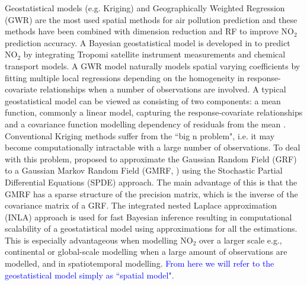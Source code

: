 \documentclass{article}
\begin{document}
Geostatistical models (e.g. Kriging) and Geographically Weighted Regression (GWR) are the most used spatial methods for air pollution prediction \citep{vicedo2013bayesian,li2014estimating,wang2021impacts,zou2016high} and these methods have been combined with dimension reduction \cite{zhai2018improved} and RF \citep{zhan2018satellite,liu2020integrate} to improve NO$_2$ prediction accuracy. A Bayesian geostatistical model is developed in \cite{BELOCONI2020105578} to predict NO$_2$ by integrating Tropomi satellite instrument measurements and chemical transport models. A GWR model naturally models spatial varying coefficients by fitting multiple local regressions depending on the homogeneity in response-covariate relationships when a number of observations are involved. A typical geostatistical model can be viewed as consisting of two components: a mean function, commonly a linear model, capturing the response-covariate relationships and a covariance function modelling dependency of residuals from the mean \citep{stackinla}. Conventional Kriging methods suffer from the ``big n problem", i.e. it may become computationally intractable with a large number of observations. To deal with this problem, \cite{lindgren2011explicit} proposed to approximate the Gaussian Random Field (GRF) to a Gaussian Markov Random Field (GMRF, \cite{rue2005gaussian}) using the Stochastic Partial Differential Equations (SPDE)
approach. The main advantage of this is that the GMRF has a sparse structure of the precision matrix, which is the inverse of the covariance matrix of a GRF. The integrated nested Laplace approximation (INLA) approach \cite{rue2009approximate} is used for fast Bayesian inference resulting in computational scalability of a geostatistical model using approximations for all the estimations. This is especially advantageous when  modelling NO$_2$ over a larger scale e.g., continental or global-scale modelling when a large amount of observations are modelled, and in spatiotemporal modelling. \textcolor{blue}{From here we will refer to the geostatistical model simply as ``spatial model".}



\end{document}
